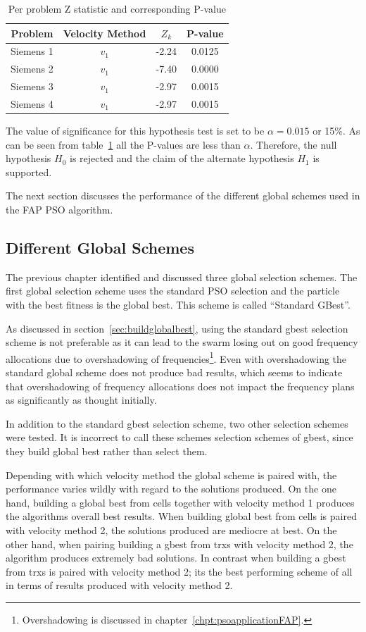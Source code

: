 \begin{table}[H]
\centering
\begin{tabular}{cccc}
    \toprule
    Problem & Velocity Method & $Z_k$ & P-value\\
    \midrule
    Siemens 1 & $v_1$ & -2.24 & 0.0125\\
    Siemens 2 & $v_1$ & -7.40 & 0.0000\\
    Siemens 3 & $v_1$ & -2.97 & 0.0015\\
    Siemens 4 & $v_1$ & -2.97 & 0.0015\\
    \bottomrule
\end{tabular}
\caption{Per problem Z statistic and corresponding P-value}
\label{tbl:ztable}
\end{table}
The value of significance for this hypothesis test is set to be $\alpha=0.015$ or 15\%. As can be seen from table~\ref{tbl:ztable} all the P-values are less than $\alpha$. Therefore, the null hypothesis $H_0$ is rejected and the claim of the alternate hypothesis $H_1$ is supported.

The next section discusses the performance of the different global schemes used in the FAP PSO algorithm.
\subsection{Different Global Schemes}
\label{sec:diffglobalschemes}
The previous chapter identified and discussed three global selection schemes. The first global selection scheme uses the standard PSO selection and the particle with the best fitness is the global best. This scheme is called ``Standard GBest''.

As discussed in section~\ref{sec:buildglobalbest}, using the standard gbest selection scheme is not preferable as it can lead to the swarm losing out on good frequency allocations due to overshadowing of frequencies\footnote{Overshadowing is discussed in chapter~\ref{chpt:psoapplicationFAP}.}.
Even with overshadowing the standard global scheme does not produce bad results, which seems to indicate that overshadowing of frequency allocations does not impact the frequency plans as significantly as thought initially.

In addition to the standard gbest selection scheme, two other selection schemes were tested. It is incorrect to call these schemes selection schemes of gbest, since they build global best rather than select them.

Depending with which velocity method the global scheme is paired with, the performance varies wildly with regard to the solutions produced. On the one hand, building a global best from cells together with velocity method 1 produces the algorithms overall best results. When building global best from cells is paired with velocity method 2, the solutions produced are mediocre at best. On the other hand, when pairing building a gbest from trxs with velocity method 2, the algorithm produces extremely bad solutions. In contrast when building a gbest from trxs is paired with velocity method 2; its the best performing scheme of all in terms of results produced with velocity method 2.


